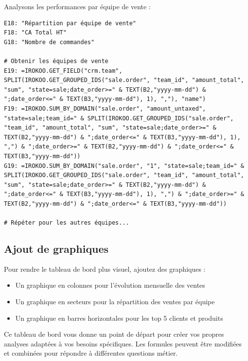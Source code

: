 \documentclass[12pt, a4paper]{article}
\begin{document}
Analysons les performances par équipe de vente :

\begin{lstlisting}
E18: "Répartition par équipe de vente"
F18: "CA Total HT"
G18: "Nombre de commandes"

# Obtenir les équipes de vente
E19: =IROKOO.GET_FIELD("crm.team", SPLIT(IROKOO.GET_GROUPED_IDS("sale.order", "team_id", "amount_total", "sum", "state=sale;date_order>=" & TEXT(B2,"yyyy-mm-dd") & ";date_order<=" & TEXT(B3,"yyyy-mm-dd"), 1), ","), "name")
F19: =IROKOO.SUM_BY_DOMAIN("sale.order", "amount_untaxed", "state=sale;team_id=" & SPLIT(IROKOO.GET_GROUPED_IDS("sale.order", "team_id", "amount_total", "sum", "state=sale;date_order>=" & TEXT(B2,"yyyy-mm-dd") & ";date_order<=" & TEXT(B3,"yyyy-mm-dd"), 1), ",") & ";date_order>=" & TEXT(B2,"yyyy-mm-dd") & ";date_order<=" & TEXT(B3,"yyyy-mm-dd"))
G19: =IROKOO.SUM_BY_DOMAIN("sale.order", "1", "state=sale;team_id=" & SPLIT(IROKOO.GET_GROUPED_IDS("sale.order", "team_id", "amount_total", "sum", "state=sale;date_order>=" & TEXT(B2,"yyyy-mm-dd") & ";date_order<=" & TEXT(B3,"yyyy-mm-dd"), 1), ",") & ";date_order>=" & TEXT(B2,"yyyy-mm-dd") & ";date_order<=" & TEXT(B3,"yyyy-mm-dd"))

# Répéter pour les autres équipes...
\end{lstlisting}

\subsection{Ajout de graphiques}

Pour rendre le tableau de bord plus visuel, ajoutez des graphiques :

\begin{itemize}
    \item Un graphique en colonnes pour l'évolution mensuelle des ventes
    \item Un graphique en secteurs pour la répartition des ventes par équipe
    \item Un graphique en barres horizontales pour les top 5 clients et produits
\end{itemize}

Ce tableau de bord vous donne un point de départ pour créer vos propres analyses adaptées à vos besoins spécifiques. Les formules peuvent être modifiées et combinées pour répondre à différentes questions métier.
\end{document}
